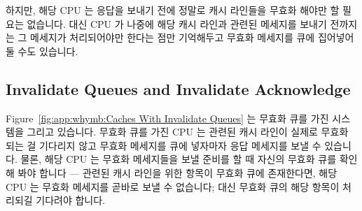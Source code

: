하지만, 해당 CPU 는 응답을 보내기 전에 정말로 캐시 라인들을 무효화 해야만 할
필요는 없습니다.
대신 CPU 가 나중에 해당 캐시 라인과 관련된 메세지를 보내기 전까지는 그 메세지가
처리되어야만 한다는 점만 기억해두고 무효화 메세지를 큐에 집어넣어 둘 수도
있습니다.

\subsection{Invalidate Queues and Invalidate Acknowledge}
\label{sec:app:whymb:Invalidate Queues and Invalidate Acknowledge}

Figure~\ref{fig:app:whymb:Caches With Invalidate Queues} 는 무효화 큐를 가진
시스템을 그리고 있습니다.
무효화 큐를 가진 CPU 는 관련된 캐시 라인이 실제로 무효화 되는 걸 기다리지 않고
무효화 메세지를 큐에 넣자마자 응답 메세지를 보낼 수 있습니다.
물론, 해당 CPU 는 무효화 메세지들을 보낼 준비를 할 때 자신의 무효화 큐를 확인해
봐야 합니다 --- 관련된 캐시 라인을 위한 항목이 무효화 큐에 존재한다면, 해당 CPU
는 무효화 메세지를 곧바로 보낼 수 없습니다; 대신 무효화 큐의 해당 항목이
처리되길 기다려야 합니다.

